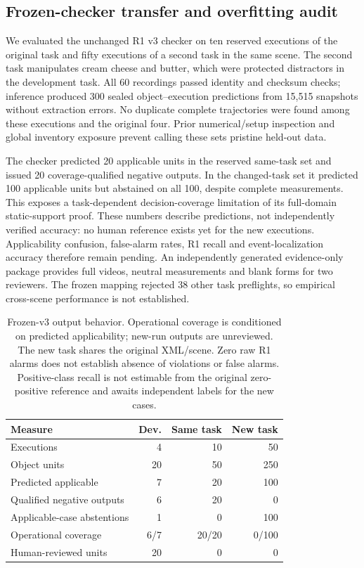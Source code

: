 \subsection{Frozen-checker transfer and overfitting audit}
We evaluated the unchanged R1 v3 checker on ten reserved executions of the original task and fifty executions of a second task in the same scene. The second task manipulates cream cheese and butter, which were protected distractors in the development task. All 60 recordings passed identity and checksum checks; inference produced 300 sealed object--execution predictions from 15,515 snapshots without extraction errors. No duplicate complete trajectories were found among these executions and the original four. Prior numerical/setup inspection and global inventory exposure prevent calling these sets pristine held-out data.

The checker predicted 20 applicable units in the reserved same-task set and issued 20 coverage-qualified negative outputs. In the changed-task set it predicted 100 applicable units but abstained on all 100, despite complete measurements. This exposes a task-dependent decision-coverage limitation of its full-domain static-support proof. These numbers describe predictions, not independently verified accuracy: no human reference exists yet for the new executions. Applicability confusion, false-alarm rates, R1 recall and event-localization accuracy therefore remain pending. An independently generated evidence-only package provides full videos, neutral measurements and blank forms for two reviewers. The frozen mapping rejected 38 other task preflights, so empirical cross-scene performance is not established.

\begin{table}[t]
\centering
\small
\begin{tabular}{lrrr}
\hline
Measure & Dev. & Same task & New task \\
\hline
Executions & 4 & 10 & 50 \\
Object units & 20 & 50 & 250 \\
Predicted applicable & 7 & 20 & 100 \\
Qualified negative outputs & 6 & 20 & 0 \\
Applicable-case abstentions & 1 & 0 & 100 \\
Operational coverage & 6/7 & 20/20 & 0/100 \\
Human-reviewed units & 20 & 0 & 0 \\
\hline
\end{tabular}
\caption{Frozen-v3 output behavior. Operational coverage is conditioned on predicted applicability; new-run outputs are unreviewed. The new task shares the original XML/scene. Zero raw R1 alarms does not establish absence of violations or false alarms. Positive-class recall is not estimable from the original zero-positive reference and awaits independent labels for the new cases.}
\label{tab:r1-frozen-transfer}
\end{table}
